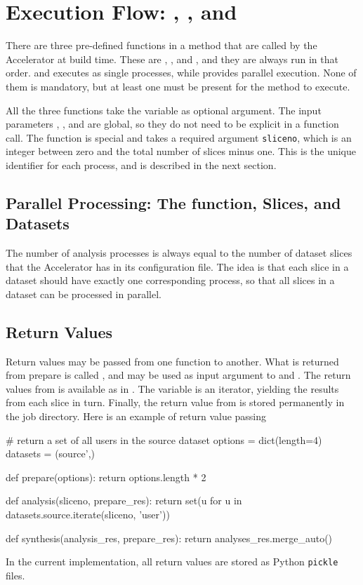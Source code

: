 \newpage
\section{Execution Flow:  \prepare, \analysis, and \synthesis}

There are three pre-defined functions in a method that are called by
the Accelerator at build time.  These are \prepare, \analysis, and
\synthesis, and they are always run in that order.  \prepare and
\synthesis executes as single processes, while \analysis provides
parallel execution.  None of them is mandatory, but at least one must
be present for the method to execute.

All the three functions take the \params variable as optional
argument.  The input parameters \options, \jobids, and \datasets are
global, so they do not need to be explicit in a function call.  The
\analysis function is special and takes a required argument
\texttt{sliceno}, which is an integer between zero and the total
number of slices minus one.  This is the unique identifier for each
\analysis process, and is described in the next section.


\subsection{Parallel Processing:  The \analysis function, Slices, and Datasets}
The number of analysis processes is always equal to the number of
dataset slices that the Accelerator has in its configuration file.
The idea is that each slice in a dataset should have exactly one
corresponding \analysis process, so that all slices in a dataset can be
processed in parallel.



\subsection{Return Values}
Return values may be passed from one function to another.  What is
returned from prepare is called \prepareres, and may be used as input
argument to \analysis and \synthesis.  The return values from
\analysis is available as \analysisres in \synthesis.  The
\analysisres variable is an iterator, yielding the results from each
slice in turn.  Finally, the return value from \synthesis is stored
permanently in the job directory.  Here is an example of return value
passing
\begin{python}
# return a set of all users in the source dataset
options = dict(length=4)
datasets = (source',)

def prepare(options):
    return options.length * 2

def analysis(sliceno, prepare_res):
    return set(u for u in datasets.source.iterate(sliceno, 'user'))

def synthesis(analysis_res, prepare_res):
     return analyses_res.merge_auto()
\end{python}
In the current implementation, all return values are stored as Python
\texttt{pickle} files.

